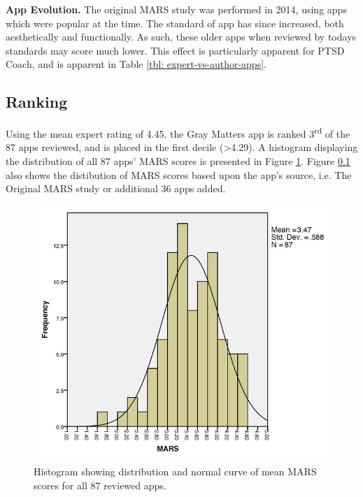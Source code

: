 \textbf{App Evolution.}
The original MARS study was performed in 2014, using apps which were popular at the time. The standard of app has since increased, both aesthetically and functionally. As such, these older apps when reviewed by todays standards may score much lower. This effect is particularly apparent for PTSD Coach, and is apparent in Table \ref{tbl: expert-vs-author-apps}. 

\subsection{Ranking}
Using the mean expert rating of 4.45, the Gray Matters app is ranked 3\textsuperscript{rd} of the 87 apps reviewed, and is placed in the first decile (\textgreater 4.29). A histogram displaying the distribution of all 87 apps' MARS scores is presented in Figure \ref{fig: allapps-histogram}. Figure \ref{} also shows the distibution of MARS scores based upon the app's source, i.e. The Original MARS study or additional 36 apps added.

\begin{figure}[h]
    \centering
    \includegraphics[scale=0.4, angle=0]{Files/prevention-study-2/figures/allapps-histogram}
    \caption{Histogram showing distribution and normal curve of mean MARS scores for all 87 reviewed apps.}
    \label{fig: allapps-histogram}
\end{figure}

